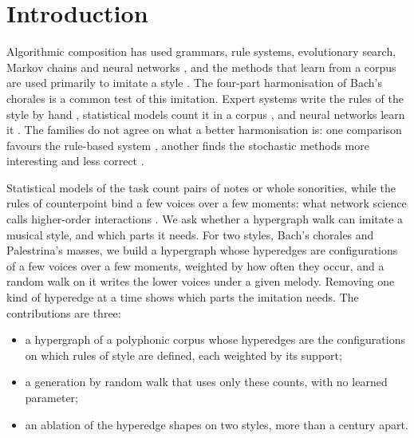 \section{Introduction}


Algorithmic composition has used grammars, rule systems, evolutionary search, Markov chains and neural networks \cite{fernandez2013, herremans2017}, and the methods that learn from a corpus are used primarily to imitate a style \cite{fernandez2013}. The four-part harmonisation of Bach's chorales is a common test of this imitation. Expert systems write the rules of the style by hand \cite{ebcioglu1988}, statistical models count it in a corpus \cite{allan2004, whorley2016, zhu2021}, and neural networks learn it \cite{hild1991, hadjeres2017, liang2017, huang2017}. 
The families do not agree on what a better harmonisation is: one comparison favours the rule-based system \cite{phonamnuaisuk1999}, another finds the stochastic methods more interesting and less correct \cite{sikora2023}.

Statistical models of the task count pairs of notes or whole sonorities, while the rules of counterpoint bind a few voices over a few moments: what network science calls higher-order interactions \cite{battiston2020}. 
We ask whether a hypergraph walk can imitate a musical style, and which parts it needs. For two styles, Bach's chorales and Palestrina's masses, we build a hypergraph whose hyperedges are configurations of a few voices over a few moments, weighted by how often they occur, and a random walk on it writes the lower voices under a given melody. Removing one kind of hyperedge at a time shows which parts the imitation needs. The contributions are three:
\begin{itemize}
\item a hypergraph of a polyphonic corpus whose hyperedges are the configurations on which rules of style are defined, each weighted by its support;
\item a generation by random walk that uses only these counts, with no learned parameter;
\item an ablation of the hyperedge shapes on two styles, more than a century apart.
\end{itemize}

